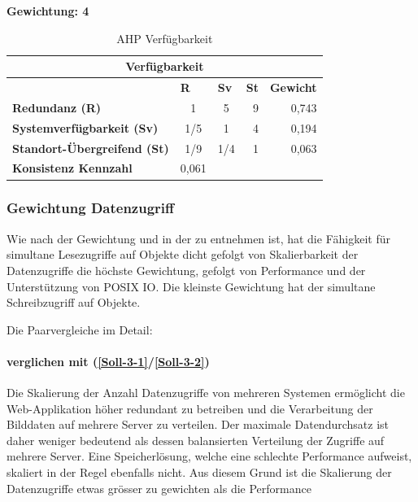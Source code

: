 \textbf{Gewichtung: 4}

\begin{table}[htbp]
\caption{AHP Verfügbarkeit}
\begin{tabular}{|l|c|c|c|l|}
\hline
\multicolumn{ 5}{|c|}{\textbf{Verfügbarkeit}} \\ \hline
 & \multicolumn{1}{l|}{\textbf{R}} & \multicolumn{1}{l|}{\textbf{Sv}} & \textbf{St} & \textbf{Gewicht} \\ \hline
\textbf{Redundanz (R)} & 1 & 5 & \multicolumn{1}{r|}{9} & \multicolumn{1}{r|}{0,743} \\ \hline
\textbf{Systemverfügbarkeit (Sv)} & 1/5 & 1 & \multicolumn{1}{r|}{4} & \multicolumn{1}{r|}{0,194} \\ \hline
\textbf{Standort-Übergreifend (St)} & 1/9 & 1/4 & \multicolumn{1}{r|}{1} & \multicolumn{1}{r|}{0,063} \\ \hline
\textbf{Konsistenz Kennzahl} & 0,061 \\ \cline{1-2}
\end{tabular}
\label{tab:AHPVerfügbarkeit}
\end{table}

\subsubsection*{Gewichtung Datenzugriff}

Wie nach der Gewichtung und in der  zu entnehmen ist, hat die Fähigkeit für simultane Lesezugriffe auf Objekte dicht gefolgt von Skalierbarkeit der Datenzugriffe die höchste Gewichtung, gefolgt von Performance und der Unterstützung von POSIX IO. Die kleinste Gewichtung hat der simultane Schreibzugriff auf Objekte.


Die Paarvergleiche im Detail:

\paragraph*{ verglichen mit  (\ref{Soll-3-1}/\ref{Soll-3-2})}
Die Skalierung der Anzahl Datenzugriffe von mehreren Systemen ermöglicht die Web-Applikation höher redundant zu betreiben und die Verarbeitung der Bilddaten auf mehrere Server zu verteilen. Der maximale Datendurchsatz ist daher weniger bedeutend als dessen balansierten Verteilung der Zugriffe auf mehrere Server. Eine Speicherlösung, welche eine schlechte Performance aufweist, skaliert in der Regel ebenfalls nicht. Aus diesem Grund ist die Skalierung der Datenzugriffe etwas grösser zu gewichten als die Performance 


